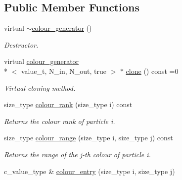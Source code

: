 \subsection*{Public Member Functions}
\begin{DoxyCompactItemize}
\item 
\hypertarget{a00084_a5a22c6908b2c697886974a0feecedfdc}{virtual \hyperlink{a00084_a5a22c6908b2c697886974a0feecedfdc}{$\sim$colour\-\_\-generator} ()}\label{a00084_a5a22c6908b2c697886974a0feecedfdc}

\begin{DoxyCompactList}\small\item\em Destructor. \end{DoxyCompactList}\item 
\hypertarget{a00084_aac467bb578b7dcf03af0fcc266e2e30e}{virtual \hyperlink{a00082}{colour\-\_\-generator}\\*
$<$ value\-\_\-t, N\-\_\-in, N\-\_\-out, true $>$ $\ast$ \hyperlink{a00084_aac467bb578b7dcf03af0fcc266e2e30e}{clone} () const =0}\label{a00084_aac467bb578b7dcf03af0fcc266e2e30e}

\begin{DoxyCompactList}\small\item\em Virtual cloning method. \end{DoxyCompactList}\item 
\hypertarget{a00084_a61583f8635cb79942a325cf35a18ad93}{size\-\_\-type \hyperlink{a00084_a61583f8635cb79942a325cf35a18ad93}{colour\-\_\-rank} (size\-\_\-type i) const }\label{a00084_a61583f8635cb79942a325cf35a18ad93}

\begin{DoxyCompactList}\small\item\em Returns the colour rank of particle i. \end{DoxyCompactList}\item 
\hypertarget{a00084_add07070a70fe7c835333065ffc19ca8d}{size\-\_\-type \hyperlink{a00084_add07070a70fe7c835333065ffc19ca8d}{colour\-\_\-range} (size\-\_\-type i, size\-\_\-type j) const }\label{a00084_add07070a70fe7c835333065ffc19ca8d}

\begin{DoxyCompactList}\small\item\em Returns the range of the j-\/th colour of particle i. \end{DoxyCompactList}\item 
\hypertarget{a00084_a919520e8427003cf13e84daf4de11212}{c\-\_\-value\-\_\-type \& \hyperlink{a00084_a919520e8427003cf13e84daf4de11212}{colour\-\_\-entry} (size\-\_\-type i, size\-\_\-type j)}\label{a00084_a919520e8427003cf13e84daf4de11212}


\end{DoxyCompactItemize}
